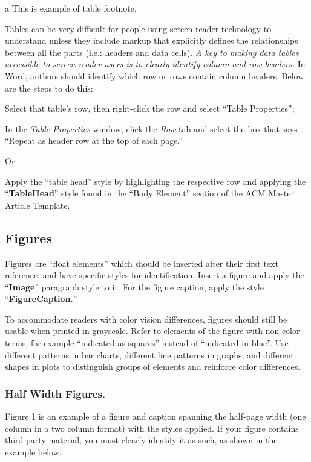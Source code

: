 \documentclass[conference]{IEEEtran}
\begin{document}
a This is example of table footnote.

Tables can be very difficult for people using screen reader technology to understand unless they include markup that explicitly defines the relationships between all the parts (i.e.: headers and data cells). \textit{A key to making data tables accessible to screen reader users is to clearly identify column and row headers.}\textit{ }In Word, authors should identify which row or rows contain column headers. Below are the steps to do this:

Select that table’s row, then right-click the row and select “Table Properties”;

In the \textit{Table Properties} window, click the \textit{Row }tab and select the box that says “Repeat as header row at the top of each page.”

Or

Apply the “table head” style by highlighting the respective row and applying the “\textbf{TableHead}” style found in the “Body Element” section of the ACM Master Article Template.

\subsection{Figures}

Figures are “float elements” which should be inserted after their first text reference, and have specific styles for identification. Insert a figure and apply the “\textbf{Image}” paragraph style to it. For the figure caption, apply the style “\textbf{FigureCaption}\textbf{.}” 

To accommodate readers with color vision differences, figures should still be usable when printed in grayscale. Refer to elements of the figure with non-color terms, for example “indicated as squares” instead of “indicated in blue”. Use different patterns in bar charts, different line patterns in graphs, and different shapes in plots to distinguish groups of elements and reinforce color differences.

\subsubsection{Half Width Figures.}

Figure 1 is an example of a figure and caption spanning the half-page width (one column in a two column format) with the styles applied.  If your figure contains third-party material, you must clearly identify it as such, as shown in the example below.
\end{document}
